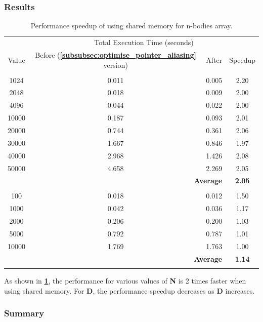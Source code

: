 \documentclass[12pt, a4paper]{article}
\let\oldcref\cref
\renewcommand{\cref}[1]{\textbf{\oldcref{#1}}}
\begin{document}
\subsubsection{Results} \label{subsec:shared_mem_results}
\renewcommand{\arraystretch}{1.3}
\begin{longtable}{|c|c|c|c|}
  \hline \endfirsthead & \multicolumn{3}{c|}{Total Execution Time (seconds)} \\ \cline{2-4}
  \multirow{-2}{*}{Value} & Before (\cref{subsubsec:optimise_pointer_aliasing} version) & After &
  Speedup \\ \hline
  \rowcolor{lightgray}\multicolumn{4}{|c|}{\textbf{Number of Bodies (N)}} \\ \hline
  1024  & 0.011 & 0.005 & 2.20 \\
  2048  & 0.018 & 0.009 & 2.00 \\
  4096  & 0.044 & 0.022 & 2.00 \\
  10000 & 0.187 & 0.093 & 2.01 \\
  20000 & 0.744 & 0.361 & 2.06 \\
  30000 & 1.667 & 0.846 & 1.97 \\
  40000 & 2.968 & 1.426 & 2.08 \\
  50000 & 4.658 & 2.269 & 2.05 \\ \hline
  \multicolumn{3}{|r|}{\textbf{Average}} & \textbf{2.05} \\ \hline
  \rowcolor{lightgray}\multicolumn{4}{|c|}{\textbf{Activity Grid Dimension (D)}} \\ \hline
  100   & 0.018 & 0.012 & 1.50 \\
  1000  & 0.042 & 0.036 & 1.17 \\
  2000  & 0.206 & 0.200 & 1.03 \\
  5000  & 0.792 & 0.787 & 1.01 \\
  10000 & 1.769 & 1.763 & 1.00 \\ \hline
  \multicolumn{3}{|r|}{\textbf{Average}} & \textbf{1.14} \\ \hline
  \caption{Performance speedup of using shared memory for n-bodies array.}
  \label{table:shared_mem_soa}
\end{longtable}
\renewcommand{\arraystretch}{1}

As shown in \cref{table:shared_mem_soa}, the performance for various values of \textbf{N} is 2 times
faster when using shared memory. For \textbf{D}, the performance speedup decreases as \textbf{D}
increases.

\subsubsection{Summary}
\end{document}
